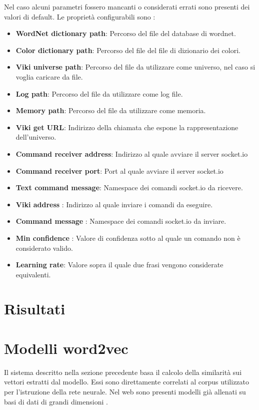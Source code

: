\documentclass[twoside]{supsistudent}
\begin{document}
Nel caso alcuni parametri fossero mancanti o considerati errati sono presenti dei valori di default.
Le proprietà configurabili sono :
\begin{itemize}

  \item \textbf{WordNet dictionary path}: Percorso del file del database di wordnet.
   \item \textbf{Color dictionary path}: Percorso del file del file di dizionario dei colori.
      \item \textbf{Viki universe path}: Percorso del file da utilizzare come universo, nel caso si voglia caricare da file.
      \item \textbf{Log path}: Percorso del file da utilizzare come log file.
      \item \textbf{Memory path}: Percorso del file da utilizzare come memoria.
      \item \textbf{Viki get URL}: Indirizzo della chiamata che espone la rappresentazione dell'universo.
      \item \textbf{Command receiver address}: Indirizzo al quale avviare il server socket.io
      \item \textbf{Command receiver port}: Port al quale avviare il server socket.io
      \item \textbf{Text command message}: Namespace dei comandi socket.io da ricevere.
      \item \textbf{Viki address }: Indirizzo al quale inviare i comandi da eseguire.
      \item \textbf{Command message }: Namespace dei comandi socket.io da inviare.
            \item \textbf{Min confidence }: Valore di confidenza sotto al quale un comando non è considerato valido.
            \item \textbf{Learning rate}: Valore sopra il quale due frasi vengono considerate equivalenti.

\end{itemize}
\chapter{Risultati}



\chapter{Modelli word2vec}
Il sistema descritto nella sezione precedente basa il calcolo della similarità sui vettori estratti dal modello. Essi sono direttamente correlati al corpus \cite{corpus} utilizzato per l'istruzione della rete neurale. Nel web sono presenti modelli già allenati su basi di dati di grandi dimensioni \cite{trained_models}.
\end{document}

